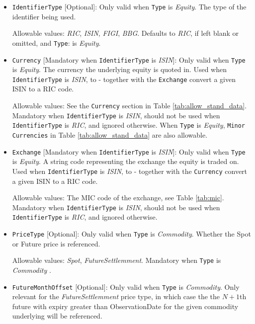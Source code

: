 \begin{itemize}
\item \lstinline!IdentifierType! [Optional]:
Only valid when \lstinline!Type! is  \emph{Equity}. The type of the identifier being used.  

Allowable values:  \emph{RIC}, \emph{ISIN}, \emph{FIGI}, \emph{BBG}. Defaults to \emph{RIC}, if left blank or omitted, and \lstinline!Type!: is  \emph{Equity}.

\item \lstinline!Currency! [Mandatory when \lstinline!IdentifierType! is  \emph{ISIN}]: Only valid when \lstinline!Type! is  \emph{Equity}. The currency the underlying equity is quoted in. Used when \lstinline!IdentifierType! is  \emph{ISIN}, to - together with the \lstinline!Exchange!  convert a given ISIN to a RIC code.  

Allowable values: See the \lstinline!Currency! section in Table \ref{tab:allow_stand_data}. Mandatory when \lstinline!IdentifierType! is  \emph{ISIN}, should not be used when  \lstinline!IdentifierType! is  \emph{RIC}, and ignored otherwise. When \lstinline!Type! is \emph{Equity}, \lstinline!Minor Currencies! in Table \ref{tab:allow_stand_data} are also allowable.

\item \lstinline!Exchange! [Mandatory when \lstinline!IdentifierType! is  \emph{ISIN}]:
Only valid when \lstinline!Type! is  \emph{Equity}. A string code representing the exchange the equity is traded on. Used when \lstinline!IdentifierType! is  \emph{ISIN}, to - together with the \lstinline!Currency!  convert a given ISIN to a RIC code.  

Allowable values:  The MIC code of the exchange, see Table \ref{tab:mic}. Mandatory when \lstinline!IdentifierType! is  \emph{ISIN}, should not be used when  \lstinline!IdentifierType! is \emph{RIC}, and ignored otherwise.

\item \lstinline!PriceType! [Optional]:
Only valid when  \lstinline!Type! is  \emph{Commodity}.  Whether the Spot or Future price is referenced. 

Allowable values:  \emph{Spot}, \emph{FutureSettlemment}. Mandatory when  \lstinline!Type! is  \emph{Commodity} .

\item \lstinline!FutureMonthOffset! [Optional]:
Only valid when  \lstinline!Type! is  \emph{Commodity}. Only relevant for the \emph{FutureSettlemment} price type, in which case the the $N+1$th future with
  expiry greater than ObservationDate for the given commodity underlying will be referenced.


\end{itemize}
